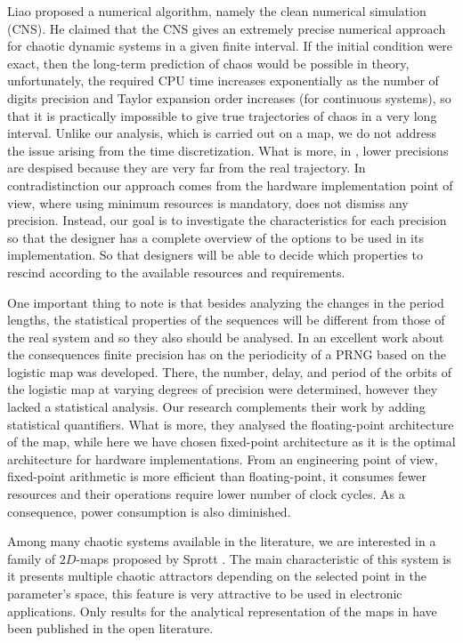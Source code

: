 Liao \cite{Liao2013b,Liao2012,Liao2009} proposed a numerical algorithm, namely the clean numerical simulation (CNS).
He claimed that the CNS gives an extremely precise numerical approach for chaotic dynamic systems in a given finite interval.
If the initial condition were exact, then the long-term prediction of chaos would be possible in theory, unfortunately, the required CPU time increases exponentially as the number of digits precision and Taylor expansion order increases (for continuous systems), so that it is practically impossible to give true trajectories of chaos in a very long interval.
Unlike our analysis, which is carried out on a map, we do not address the issue arising from the time discretization.
What is more, in \cite{Liao2009}, lower precisions are despised because they are very far from the real trajectory.
In contradistinction our approach comes from the hardware implementation point of view, where using minimum resources is mandatory, does not dismiss any precision.
Instead, our goal is to investigate the characteristics for each precision so that the designer has a complete overview of the options to be used in its implementation.
So that designers will be able to decide which properties to rescind according to the available resources and requirements.

One important thing to note is that besides analyzing the changes in the period lengths, the statistical properties of the sequences will be different from those of the real system and so they also should be analysed.
In \cite{Persohn2012} an excellent work about the consequences finite precision has on the periodicity of a PRNG based on the logistic map was developed.
There, the number, delay, and period of the orbits of the logistic map at varying degrees of precision were determined, however they lacked a statistical analysis.
Our research complements their work by adding statistical quantifiers.
What is more, they analysed the floating-point architecture of the map, while here we have chosen fixed-point architecture as it is the optimal architecture for hardware implementations.
From an engineering point of view, fixed-point arithmetic is more efficient than floating-point, it consumes fewer resources and their operations require lower number of clock cycles.
As a consequence, power consumption is also diminished.

Among many chaotic systems available in the literature, we are interested in a family of $2D$-maps proposed by Sprott \cite{Sprott1993}. 
The main characteristic of this system is it presents multiple chaotic attractors depending on the selected point in the parameter's space, this feature is very attractive to be used in electronic applications.
Only results for the analytical representation of the maps in \cite{Sprott1993} have been published in the open literature.

